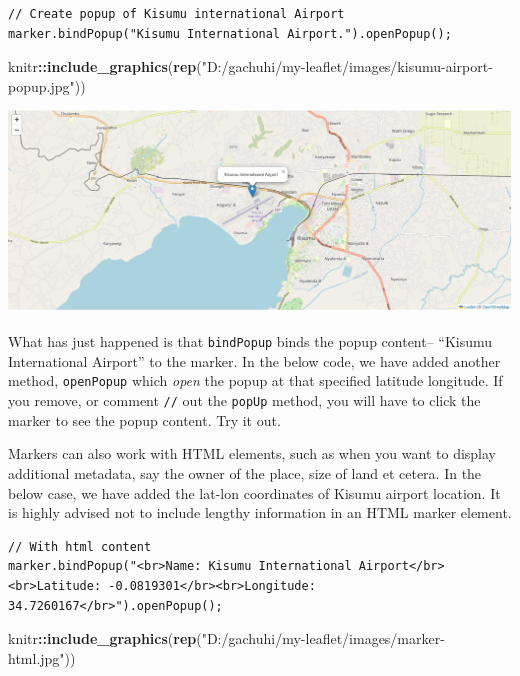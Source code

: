 \documentclass[
]{book}
\newenvironment{Shaded}{\begin{snugshade}}{\end{snugshade}}
\newcommand{\FunctionTok}[1]{\textcolor[rgb]{0.13,0.29,0.53}{\textbf{#1}}}
\newcommand{\NormalTok}[1]{#1}
\newcommand{\SpecialCharTok}[1]{\textcolor[rgb]{0.81,0.36,0.00}{\textbf{#1}}}
\newcommand{\StringTok}[1]{\textcolor[rgb]{0.31,0.60,0.02}{#1}}
\begin{document}
\begin{verbatim}
// Create popup of Kisumu international Airport
marker.bindPopup("Kisumu International Airport.").openPopup();
\end{verbatim}

\begin{Shaded}
\begin{Highlighting}[]
\NormalTok{knitr}\SpecialCharTok{::}\FunctionTok{include\_graphics}\NormalTok{(}\FunctionTok{rep}\NormalTok{(}\StringTok{"D:/gachuhi/my{-}leaflet/images/kisumu{-}airport{-}popup.jpg"}\NormalTok{))}
\end{Highlighting}
\end{Shaded}

\includegraphics{../images/kisumu-airport-popup.jpg}

What has just happened is that \texttt{bindPopup} binds the popup content-- ``Kisumu International Airport'' to the marker. In the below code, we have added another method, \texttt{openPopup} which \emph{open} the popup at that specified latitude longitude. If you remove, or comment \texttt{//} out the \texttt{popUp} method, you will have to click the marker to see the popup content. Try it out.

Markers can also work with HTML elements, such as when you want to display additional metadata, say the owner of the place, size of land et cetera. In the below case, we have added the lat-lon coordinates of Kisumu airport location. It is highly advised not to include lengthy information in an HTML marker element.

\begin{verbatim}
// With html content
marker.bindPopup("<br>Name: Kisumu International Airport</br><br>Latitude: -0.0819301</br><br>Longitude: 34.7260167</br>").openPopup();
\end{verbatim}

\begin{Shaded}
\begin{Highlighting}[]
\NormalTok{knitr}\SpecialCharTok{::}\FunctionTok{include\_graphics}\NormalTok{(}\FunctionTok{rep}\NormalTok{(}\StringTok{"D:/gachuhi/my{-}leaflet/images/marker{-}html.jpg"}\NormalTok{))}
\end{Highlighting}
\end{Shaded}
\end{document}
